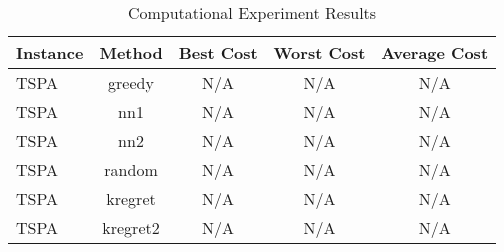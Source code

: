 \begin{table}[ht]
\centering
\caption{Computational Experiment Results}
\label{tab:results}
\begin{tabular}{lcccc}
\hline
Instance & Method & Best Cost & Worst Cost & Average Cost \\
\hline
TSPA & greedy & N/A & N/A & N/A \\
TSPA & nn1 & N/A & N/A & N/A \\
TSPA & nn2 & N/A & N/A & N/A \\
TSPA & random & N/A & N/A & N/A \\
TSPA & kregret & N/A & N/A & N/A \\
TSPA & kregret2 & N/A & N/A & N/A \\
\hline
\end{tabular}
\end{table}
